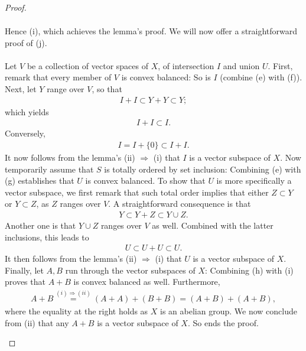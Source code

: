 \begin{proof}
\begin{enumerate}
\begin{align}
\end{align}
%
Hence (i), which achieves the lemma's proof. %
We will now offer a straightforward proof of (j). \\
\\
Let $V$ be a collection of vector spaces of $X$, %
of intersection $I$ and union $U$. 
%
First, remark that every member of $V$ is convex balanced: %
So is $I$ (combine (e) with (f)). %
%
Next, let $\mathit{Y}$ range over $V$, so that %
%
\begin{align}
  I + I \subset Y + Y \subset  Y; 
\end{align}
%
which yields
%
\begin{align}
  I + I \subset I. 
\end{align}
%
Conversely, 
\begin{align}
  I  = I + \{0\} \subset I + I.
\end{align}
%
It now follows from the lemma's (ii) $\Rightarrow$ (i) that %
$I$ is a vector subspace of $X$. %
%
Now temporarily assume that $S$ is totally ordered by set inclusion: %
Combining (e) with (g) establishes that $U$ is convex balanced. %
%
To show that $U$ is more specifically a vector subspace, %
we first remark that such total order implies that either %
$Z \subset Y$ or $Y \subset Z$, as $\mathit{Z}$ ranges over $V$. %
A straightforward consequence is that 
%
\begin{align}
  Y \subset Y + Z  \subset Y\cup Z.
\end{align}
%
Another one is that $Y \cup Z$ ranges over $V$ as well. %
Combined with the latter inclusions, this leads to %
%
\begin{align}
  U \subset U  + U \subset U.
\end{align}
%
It then follows from the lemma's (ii) $\Rightarrow$ (i) that %
$U$ is a vector subspace of $X$. %
%
Finally, let $\mathit{A},\mathit{B}$ run through the vector subspaces of $X$: %
Combining (h) with (i) proves that $A+B$ is convex balanced as well. %
%
Furthermore, %
%
\begin{align}
  A + B \overset{(i) \Rightarrow (ii)}{=} (A + A) + (B + B) = (A + B) + (A + B),
\end{align}
% 
where the equality at the right holds as $X$ is an abelian group. %
We now conclude from (ii) that any $A+B$ is a vector subspace of $X$. %
%
So ends the proof. %
\end{enumerate}
\end{proof}